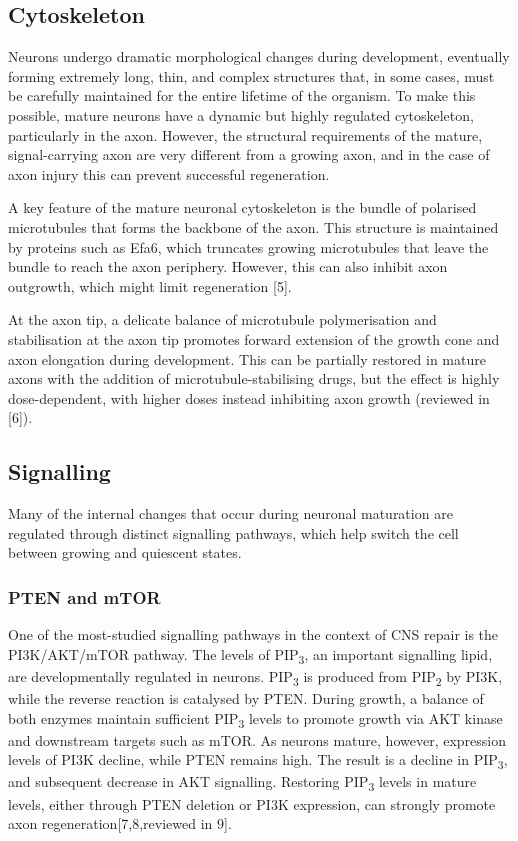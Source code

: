 \documentclass[
  12pt,
  a4paper,
]{book}
\begin{document}
\hypertarget{cytoskeleton}{%
\subsection{Cytoskeleton}\label{cytoskeleton}}

Neurons undergo dramatic morphological changes during development, eventually forming extremely long, thin, and complex structures that, in some cases, must be carefully maintained for the entire lifetime of the organism. To make this possible, mature neurons have a dynamic but highly regulated cytoskeleton, particularly in the axon. However, the structural requirements of the mature, signal-carrying axon are very different from a growing axon, and in the case of axon injury this can prevent successful regeneration.

A key feature of the mature neuronal cytoskeleton is the bundle of polarised microtubules that forms the backbone of the axon. This structure is maintained by proteins such as Efa6, which truncates growing microtubules that leave the bundle to reach the axon periphery. However, this can also inhibit axon outgrowth, which might limit regeneration {[}5{]}.

At the axon tip, a delicate balance of microtubule polymerisation and stabilisation at the axon tip promotes forward extension of the growth cone and axon elongation during development. This can be partially restored in mature axons with the addition of microtubule-stabilising drugs, but the effect is highly dose-dependent, with higher doses instead inhibiting axon growth (reviewed in {[}6{]}).

\hypertarget{signalling}{%
\subsection{Signalling}\label{signalling}}

Many of the internal changes that occur during neuronal maturation are regulated through distinct signalling pathways, which help switch the cell between growing and quiescent states.

\hypertarget{pten-and-mtor}{%
\subsubsection{PTEN and mTOR}\label{pten-and-mtor}}

One of the most-studied signalling pathways in the context of CNS repair is the PI3K/AKT/mTOR pathway. The levels of PIP\textsubscript{3}, an important signalling lipid, are developmentally regulated in neurons. PIP\textsubscript{3} is produced from PIP\textsubscript{2} by PI3K, while the reverse reaction is catalysed by PTEN. During growth, a balance of both enzymes maintain sufficient PIP\textsubscript{3} levels to promote growth via AKT kinase and downstream targets such as mTOR. As neurons mature, however, expression levels of PI3K decline, while PTEN remains high. The result is a decline in PIP\textsubscript{3}, and subsequent decrease in AKT signalling. Restoring PIP\textsubscript{3} levels in mature levels, either through PTEN deletion or PI3K expression, can strongly promote axon regeneration{[}7,8,reviewed in 9{]}.
\end{document}
